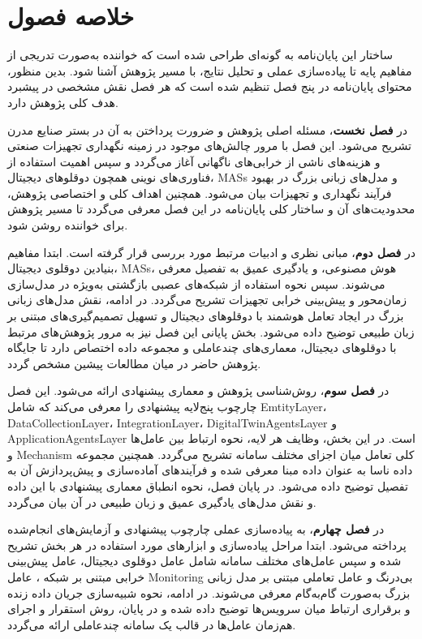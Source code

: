 \section{خلاصه فصول}

ساختار این پایان‌نامه به گونه‌ای طراحی شده است که خواننده به‌صورت تدریجی از مفاهیم پایه تا پیاده‌سازی عملی و تحلیل نتایج، با مسیر پژوهش آشنا شود. بدین منظور، محتوای پایان‌نامه در پنج فصل تنظیم شده است که هر فصل نقش مشخصی در پیشبرد هدف کلی پژوهش دارد.

در \textbf{فصل نخست}، مسئله اصلی پژوهش و ضرورت پرداختن به آن در بستر صنایع مدرن تشریح می‌شود. این فصل با مرور چالش‌های موجود در زمینه نگهداری تجهیزات صنعتی و هزینه‌های ناشی از خرابی‌های ناگهانی آغاز می‌گردد و سپس اهمیت استفاده از فناوری‌های نوینی همچون دوقلوهای دیجیتال، \glspl{MAS} و مدل‌های زبانی بزرگ در بهبود فرآیند نگهداری و 
 تجهیزات بیان می‌شود. همچنین اهداف کلی و اختصاصی پژوهش، محدودیت‌های آن و ساختار کلی پایان‌نامه در این فصل معرفی می‌گردد تا مسیر پژوهش برای خواننده روشن شود.

در \textbf{فصل دوم}، مبانی نظری و ادبیات مرتبط مورد بررسی قرار گرفته است. ابتدا مفاهیم بنیادین دوقلوی دیجیتال، \glspl{MAS}، هوش مصنوعی، و یادگیری عمیق به تفصیل معرفی می‌شوند. سپس نحوه استفاده از شبکه‌های عصبی بازگشتی به‌ویژه  در مدل‌سازی زمان‌محور و پیش‌بینی خرابی تجهیزات تشریح می‌گردد. در ادامه، نقش مدل‌های زبانی بزرگ در ایجاد تعامل هوشمند با دوقلوهای دیجیتال و تسهیل تصمیم‌گیری‌های مبتنی بر زبان طبیعی توضیح داده می‌شود. بخش پایانی این فصل نیز به مرور پژوهش‌های مرتبط با دوقلوهای دیجیتال، معماری‌های چندعاملی و مجموعه داده  اختصاص دارد تا جایگاه پژوهش حاضر در میان مطالعات پیشین مشخص گردد.

در \textbf{فصل سوم}، روش‌شناسی پژوهش و معماری پیشنهادی ارائه می‌شود. این فصل چارچوب پنج‌لایه پیشنهادی را معرفی می‌کند که شامل \gls{EmtityLayer}، \gls{DataCollectionLayer}، \gls{IntegrationLayer}، \gls{DigitalTwinAgentsLayer} و \gls{ApplicationAgentsLayer} است. در این بخش، وظایف هر لایه، نحوه ارتباط بین عامل‌ها و \gls{Mechanism} کلی تعامل میان اجزای مختلف سامانه تشریح می‌گردد. همچنین مجموعه داده  ناسا به عنوان داده مبنا معرفی شده و فرآیندهای آماده‌سازی و پیش‌پردازش آن به تفصیل توضیح داده می‌شود. در پایان فصل، نحوه انطباق معماری پیشنهادی با این داده و نقش مدل‌های یادگیری عمیق و زبان طبیعی در آن بیان می‌گردد.

در \textbf{فصل چهارم}، به پیاده‌سازی عملی چارچوب پیشنهادی و آزمایش‌های انجام‌شده پرداخته می‌شود. ابتدا مراحل پیاده‌سازی و ابزارهای مورد استفاده در هر بخش تشریح شده و سپس عامل‌های مختلف سامانه شامل عامل دوقلوی دیجیتال، عامل پیش‌بینی خرابی مبتنی بر شبکه ، عامل \gls{Monitoring} بی‌درنگ و عامل تعاملی مبتنی بر مدل زبانی بزرگ به‌صورت گام‌به‌گام معرفی می‌شوند. در ادامه، نحوه شبیه‌سازی جریان داده زنده و برقراری ارتباط میان سرویس‌ها توضیح داده شده و در پایان، روش استقرار و اجرای هم‌زمان عامل‌ها در قالب یک سامانه چندعاملی ارائه می‌گردد.

